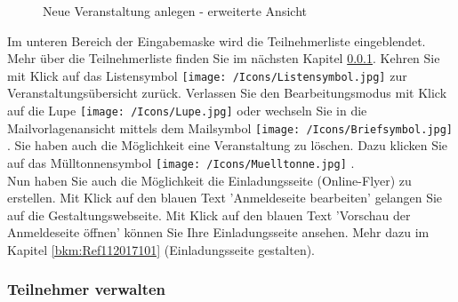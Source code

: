 \begin{figure}[H]
\caption{Neue Veranstaltung anlegen - erweiterte Ansicht}
\end{figure}

Im unteren Bereich der Eingabemaske wird die Teilnehmerliste eingeblendet. Mehr über die Teilnehmerliste finden Sie im nächsten Kapitel \ref{bkm:Ref112017102}. Kehren Sie mit Klick auf das Listensymbol \texttt{[image: /Icons/Listensymbol.jpg]}  zur Veranstaltungsübersicht zurück. Verlassen Sie den Bearbeitungsmodus mit Klick auf die Lupe \texttt{[image: /Icons/Lupe.jpg]}  oder wechseln Sie in die Mailvorlagenansicht mittels dem Mailsymbol \texttt{[image: /Icons/Briefsymbol.jpg]} . Sie haben auch die Möglichkeit eine Veranstaltung zu löschen. Dazu klicken Sie auf das Mülltonnensymbol \texttt{[image: /Icons/Muelltonne.jpg]} .\\
Nun haben Sie auch die Möglichkeit die Einladungsseite (Online-Flyer) zu erstellen. Mit Klick auf den blauen Text 'Anmeldeseite bearbeiten'  gelangen Sie auf die Gestaltungswebseite. Mit Klick auf den blauen Text 'Vorschau der Anmeldeseite öffnen'  können Sie Ihre Einladungsseite ansehen. Mehr dazu im Kapitel \ref{bkm:Ref112017101} (Einladungsseite gestalten).

\subsubsection{Teilnehmer verwalten}
\label{bkm:Ref112017102}

